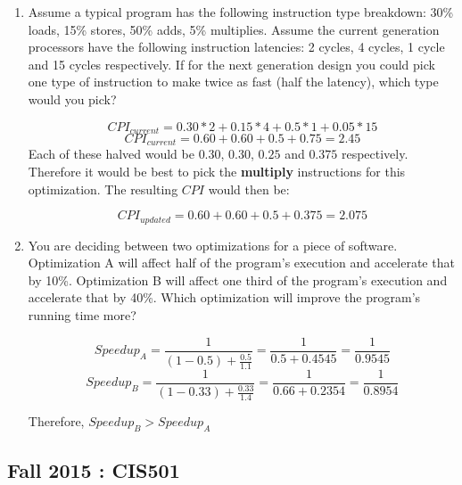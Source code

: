 \documentclass[12pt]{article}
\newenvironment{QandA}{\begin{enumerate}[label=\bfseries\alph*.]\bfseries}
                      {\end{enumerate}}
\newenvironment{answered}{\par\quad\normalfont}{}
\begin{document}
\begin{QandA}
   \item Assume a typical program has the following instruction type breakdown: 30\% loads, 15\% stores, 50\% adds, 5\% multiplies. Assume the current generation processors have the following instruction latencies: 2 cycles, 4 cycles, 1 cycle and 15 cycles respectively. If for the next generation design you could pick one type of instruction to make twice as fast (half the latency), which type would you pick?
        \begin{answered}
        \begin{equation*}
            CPI_{current} = 0.30 * 2 + 0.15 * 4 + 0.5 * 1 + 0.05 * 15
        \end{equation*}
        \begin{equation*}
            CPI_{current} = 0.60 + 0.60 + 0.5 + 0.75 = 2.45
        \end{equation*}
        Each of these halved would be $0.30$, $0.30$, $0.25$ and $0.375$ respectively. Therefore it would be best to pick the \textbf{multiply} instructions for this optimization. The resulting $CPI$ would then be:
        
        \begin{equation*}
            CPI_{updated} = 0.60 + 0.60 + 0.5 + 0.375 = 2.075
        \end{equation*}
        \end{answered}
        
    \item You are deciding between two optimizations for a piece of software. Optimization A will affect half of the program's execution and accelerate that by 10\%. Optimization B will affect one third of the program's execution and accelerate that by 40\%. Which optimization will improve the program's running time more?
    
    \begin{equation*}
        Speedup_{A} = \frac{1}{(1-0.5) + \frac{0.5}{1.1}} = \frac{1}{0.5 + 0.4545} = \frac{1}{0.9545}
    \end{equation*}
    \begin{equation*}
        Speedup_{B} = \frac{1}{(1-0.33) + \frac{0.33}{1.4}} = \frac{1}{0.66 + 0.2354} = \frac{1}{0.8954}
    \end{equation*}    
    
    Therefore, $Speedup_{B} > Speedup_{A}$
\end{QandA}

\subsection{Fall 2015 : CIS501}
\end{document}
